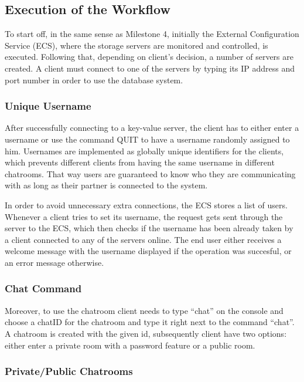 \subsection{Execution of the Workflow}
\label{sec:groupchat_executionoftheworkflow}

To start off, in the same sense as Milestone 4, initially the External Configuration Service (ECS), where the storage servers are monitored and controlled, is executed. Following that, depending on client's decision, a number of servers are created. A client must connect to one of the servers by typing its IP address and port number in order to use the database system.

\subsubsection{Unique Username}
\label{sec:groupchat_executionoftheworkflow_uniqueusername}
After successfully connecting to a key-value server, the client has to either enter a username or use the command QUIT to have a username randomly assigned to him. Usernames are implemented as globally unique identifiers for the clients, which prevents different clients from having the same username in different chatrooms. That way users are guaranteed to know who they are communicating with as long as their partner is connected to the system. 

In order to avoid unnecessary extra connections, the ECS stores a list of users. Whenever a client tries to set its username, the request gets sent through the server to the ECS, which then checks if the username has been already taken by a client connected to any of the servers online. The end user either receives a welcome message with the username displayed if the operation was succesful, or an error message otherwise.
 
\subsubsection{Chat Command}
\label{sec:groupchat_executionoftheworkflow_chatcommand}

Moreover, to use the chatroom client needs to type “chat” on the console and choose a chatID for the chatroom and type it right next to the command “chat”. A chatroom is created with the given id, subsequently client have two options: either enter a private room with a password feature or a public room. 
\subsubsection{Private/Public Chatrooms}
\label{sec:groupchat_executionoftheworkflow_chatrooms}


